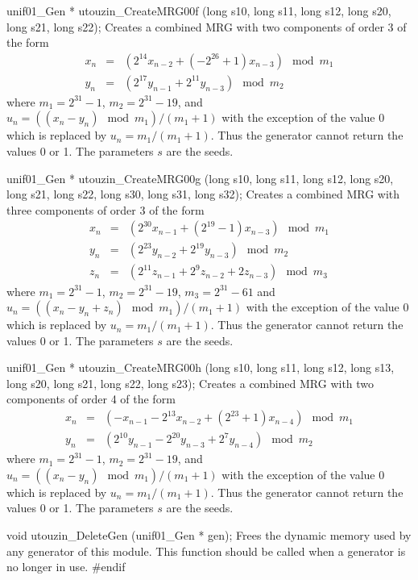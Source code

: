 unif01_Gen * utouzin_CreateMRG00f (long s10, long s11, long s12, 
                                   long s20, long s21, long s22);
\endcode
  \tab Creates a combined MRG with two components of order 3 of the form
\begin{eqnarray*}
x_n &=& \left(2^{14}x_{n-2}  + (-2^{26} + 1)x_{n-3}\right) \mod m_1 \\
y_n &=& \left(2^{17}y_{n-1}  + 2^{11}y_{n-3}\right) \mod m_2
\end{eqnarray*}
where $m_1 = 2^{31} - 1$, $m_2 = 2^{31} - 19$,  and $u_n = 
 \left((x_n - y_n)\mod m_1 \right)/(m_1+1)$ with the exception of the value
0 which is replaced by $u_n = m_1 /(m_1+1)$. Thus the generator cannot return
the values 0 or 1.
 The parameters $s$ are the seeds.
 \endtab
\code


unif01_Gen * utouzin_CreateMRG00g (long s10, long s11, long s12, 
                                   long s20, long s21, long s22,
                                   long s30, long s31, long s32);
\endcode
  \tab Creates a combined MRG with three components of order 3 of the form
\begin{eqnarray*}
x_n &=& \left(2^{30} x_{n-1} + (2^{19} - 1) x_{n-3}\right) \mod m_1 \\
y_n &=& \left(2^{23} y_{n-2} + 2^{19} y_{n-3}\right) \mod m_2 \\
z_n &=& \left(2^{11} z_{n-1} + 2^{9} z_{n-2} + 2 z_{n-3}\right) \mod m_3
\end{eqnarray*}
where $m_1 = 2^{31} - 1$, $m_2 = 2^{31} - 19$,  $m_3 = 2^{31} - 61$
 and $u_n = \left((x_n - y_n + z_n)\mod m_1 \right)/(m_1+1)$ with the
 exception of the value 0 which is replaced by $u_n = m_1 /(m_1+1)$. 
Thus the generator cannot return the values 0 or 1.
 The parameters $s$ are the seeds.
 \endtab
\code


unif01_Gen * utouzin_CreateMRG00h (long s10, long s11, long s12, long s13,
                                   long s20, long s21, long s22, long s23);
\endcode
  \tab Creates a combined MRG with two components of order 4 of the form
\begin{eqnarray*}
x_n &=& \left(-x_{n-1} - 2^{13}x_{n-2} + (2^{23} + 1)x_{n-4}\right) \mod m_1 \\
y_n &=& \left(2^{10}y_{n-1}  - 2^{20}y_{n-3} + 2^{7}y_{n-4}\right) \mod m_2
\end{eqnarray*}
where $m_1 = 2^{31} - 1$, $m_2 = 2^{31} - 19$,  and $u_n = 
 \left((x_n - y_n)\mod m_1 \right)/(m_1+1)$ with the exception of the value
0 which is replaced by $u_n = m_1 /(m_1+1)$. Thus the generator cannot return
the values 0 or 1.%
 The parameters $s$ are the seeds.
 \endtab



\code


void utouzin_DeleteGen (unif01_Gen * gen);
\endcode
  \tab Frees the dynamic memory used by any generator of this module.
  This function should be called when a generator
  is no longer in use.
 \endtab
\code\hide
#endif
\endhide
\endcode

